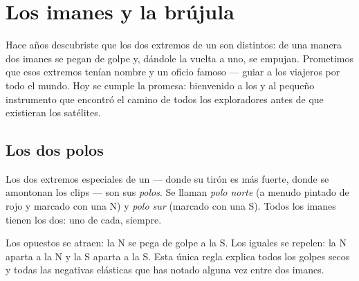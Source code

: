 \chapter{Los imanes y la brújula}\label{ch:g4:magnets-and-compass}

Hace años descubriste que los dos extremos de un  son distintos:
de una manera dos imanes se pegan de golpe y, dándole la vuelta a uno,
se empujan. Prometimos que esos extremos tenían nombre y un oficio
famoso --- guiar a los viajeros por todo el mundo. Hoy se cumple la
promesa: bienvenido a los  y al pequeño instrumento que encontró
el camino de todos los exploradores antes de que existieran los
satélites.

\section{Los dos polos}

\begin{definition}\label{def:g4:magnets-and-compass:poles}
Los dos extremos especiales de un  --- donde su tirón es más
fuerte, donde se amontonan los clips --- son sus
\emph{polos}. Se llaman \emph{polo norte} (a menudo pintado de rojo y marcado con una N) y \emph{polo
sur} (marcado con una S). Todos los imanes tienen
los dos: uno de cada, siempre.
\end{definition}

\begin{proposition}\label{prop:g4:magnets-and-compass:rule}
Los  opuestos se atraen: la N se pega de golpe a la S. Los
 iguales se repelen: la N aparta a la N y la S aparta a la S.
Esta única regla explica todos los golpes secos y todas las negativas
elásticas que has notado alguna vez entre dos imanes.
\end{proposition}

